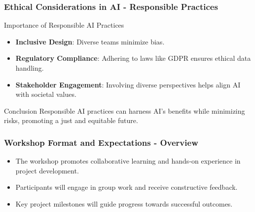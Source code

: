 \documentclass[aspectratio=169]{beamer}
\begin{document}
\begin{frame}[fragile]
    \frametitle{Ethical Considerations in AI - Responsible Practices}
    \begin{block}{Importance of Responsible AI Practices}
        \begin{itemize}
            \item \textbf{Inclusive Design}: Diverse teams minimize bias.
            \item \textbf{Regulatory Compliance}: Adhering to laws like GDPR ensures ethical data handling.
            \item \textbf{Stakeholder Engagement}: Involving diverse perspectives helps align AI with societal values.
        \end{itemize}
    \end{block}
    
    \begin{block}{Conclusion}
        Responsible AI practices can harness AI's benefits while minimizing risks, promoting a just and equitable future.
    \end{block}
\end{frame}

\begin{frame}[fragile]
    \frametitle{Workshop Format and Expectations - Overview}
    \begin{itemize}
        \item The workshop promotes collaborative learning and hands-on experience in project development.
        \item Participants will engage in group work and receive constructive feedback.
        \item Key project milestones will guide progress towards successful outcomes.
    \end{itemize}
\end{frame}
\end{document}
